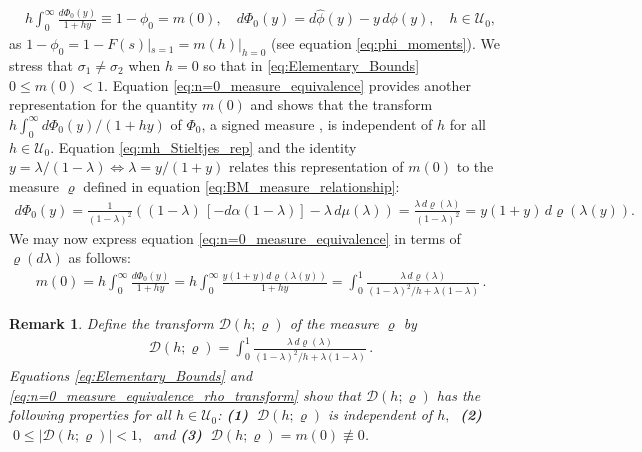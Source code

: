 \documentclass[english,12pt,jmp,graphicx]{revtex4-1}
\newtheorem{remark}{Remark}[section]
\newcommand{\ph}{\hat{\phi}}
\begin{document}
%
\begin{align}\label{eq:n=0_measure_equivalence}
 h \int_0^\infty\frac{d\Phi_0(y)}{1+hy}\equiv1-\phi_0=m(0),  \quad
 d\Phi_0(y)=d\ph(y)-y\,d\phi(y), \quad
 h\in\mathcal{U}_0,
\end{align}
%
as $1-\phi_0=1-F(s)|_{s=1}=m(h)|_{h=0}$ (see equation
\eqref{eq:phi_moments}). We stress that $\sigma_1\neq\sigma_2$ when $h=0$ so that
in \eqref{eq:Elementary_Bounds}
$0\leq m(0)<1$. Equation \eqref{eq:n=0_measure_equivalence} 
provides another representation for the quantity $m(0)$ and
shows that the transform $h\int_0^\infty d\Phi_0(y)/(1+hy)$ of $\Phi_0$, a signed
measure \cite{Rudin:87}, is independent of $h$ for all 
$h\in\mathcal{U}_0$. Equation \eqref{eq:mh_Stieltjes_rep} and the
identity $y=\lambda/(1-\lambda)\iff\lambda=y/(1+y)$ relates this representation of $m(0)$
to the measure $\varrho$ defined in equation \eqref{eq:BM_measure_relationship}:         
%
\begin{align*}%
  d\Phi_0(y)%
        =\frac{1}{(1-\lambda)^2}((1-\lambda)\,[-d\alpha(1-\lambda)]-\lambda\,d\mu(\lambda))
        =\frac{\lambda\,d\varrho(\lambda)}{(1-\lambda)^2}=y(1+y)\,d\varrho\left(\lambda(y)\right).%
\end{align*}
%
We may now express equation \eqref{eq:n=0_measure_equivalence}
in terms of $\varrho(d\lambda)$ as follows: 
%
\begin{align}\label{eq:n=0_measure_equivalence_rho_transform}
  m(0)= h\int_0^\infty\frac{d\Phi_0(y)}{1+hy}
      =h\int_0^\infty\frac{y(1+y)d\varrho(\lambda(y))}{1+hy}
      =\int_0^1\frac{\lambda\,d\varrho(\lambda)}{(1-\lambda)^2/h+\lambda(1-\lambda)}\,.
\end{align}
%
%
\begin{remark}\label{rem:varrho_conditions}
  Define the transform $\mathcal{D}(h;\varrho)$ of the measure $\varrho$ by
  \begin{align}\label{eq:D_varrho}
    \mathcal{D}(h;\varrho)=\int_0^1\frac{\lambda\,d\varrho(\lambda)}{(1-\lambda)^2/h+\lambda(1-\lambda)}\,.
  \end{align}
  Equations \eqref{eq:Elementary_Bounds} and 
  \eqref{eq:n=0_measure_equivalence_rho_transform}
  show that $\mathcal{D}(h;\varrho)$ has the following properties for
  all $h\in\mathcal{U}_0$:
  \newline
  \textbf{(1)} $\;\mathcal{D}(h;\varrho)$ is independent of $h,\;$ \textbf{(2)}
  $\;0\leq|\mathcal{D}(h;\varrho)|<1,\;$ and \textbf{(3)} $\;\mathcal{D}(h;\varrho)=m(0)\not\equiv0$. 
%  
\end{remark}
\end{document}
